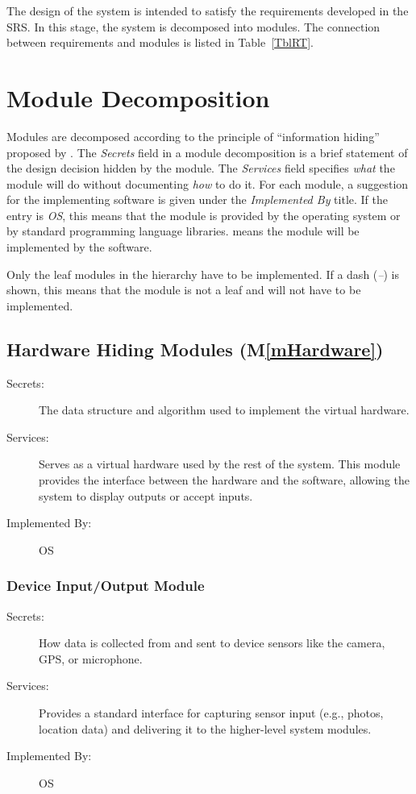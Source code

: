 \documentclass[12pt, titlepage]{article}
\newcommand{\mref}[1]{M\ref{#1}}
\begin{document}
The design of the system is intended to satisfy the requirements developed in
the SRS. In this stage, the system is decomposed into modules. The connection
between requirements and modules is listed in Table~\ref{TblRT}.


\section{Module Decomposition} \label{SecMD}

Modules are decomposed according to the principle of ``information hiding''
proposed by \citet{ParnasEtAl1984}. The \emph{Secrets} field in a module
decomposition is a brief statement of the design decision hidden by the
module. The \emph{Services} field specifies \emph{what} the module will do
without documenting \emph{how} to do it. For each module, a suggestion for the
implementing software is given under the \emph{Implemented By} title. If the
entry is \emph{OS}, this means that the module is provided by the operating
system or by standard programming language libraries.  \emph{\progname{}} means the
module will be implemented by the \progname{} software.

Only the leaf modules in the hierarchy have to be implemented. If a dash
(\emph{--}) is shown, this means that the module is not a leaf and will not have
to be implemented.

\subsection{Hardware Hiding Modules (\mref{mHardware})}

\begin{description}
\item[Secrets:] The data structure and algorithm used to implement the virtual hardware.
\item[Services:] Serves as a virtual hardware used by the rest of the system. This module provides the interface between the hardware and the software, allowing the system to display outputs or accept inputs.
\item[Implemented By:] OS
\end{description}

\subsubsection{Device Input/Output Module}

\begin{description}
\item[Secrets:] How data is collected from and sent to device sensors like the camera, GPS, or microphone.
\item[Services:] Provides a standard interface for capturing sensor input (e.g., photos, location data) and delivering it to the higher-level system modules.
\item[Implemented By:] OS
\end{description}
\end{document}
